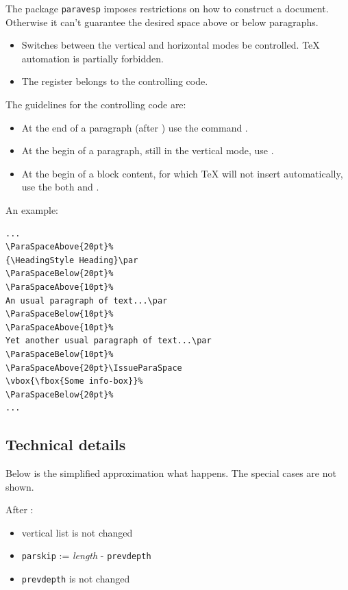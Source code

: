 \documentclass[]{ltugboat}
\begin{document}
The package \verb|paravesp| imposes restrictions on how to construct a document. Otherwise it can't guarantee the desired space above or below paragraphs.

\begin{itemize}
\item Switches between the vertical and horizontal modes be controlled. \TeX{} automation is partially forbidden.
\item The register  belongs to the controlling code.
\end{itemize}

The guidelines for the controlling code are:

\begin{itemize}
\item At the end of a paragraph (after ) use the command .
\item At the begin of a paragraph, still in the vertical mode, use .
\item At the begin of a block content, for which \TeX{} will not insert  automatically, use the both  and .
\end{itemize}

An example:

\begin{verbatim}
...
\ParaSpaceAbove{20pt}%
{\HeadingStyle Heading}\par
\ParaSpaceBelow{20pt}%
\ParaSpaceAbove{10pt}%
An usual paragraph of text...\par
\ParaSpaceBelow{10pt}%
\ParaSpaceAbove{10pt}%
Yet another usual paragraph of text...\par
\ParaSpaceBelow{10pt}%
\ParaSpaceAbove{20pt}\IssueParaSpace
\vbox{\fbox{Some info-box}}%
\ParaSpaceBelow{20pt}%
...
\end{verbatim}

\subsection{Technical details}

Below is the simplified approximation what happens. The special cases are not shown.

\medskip

After :

\begin{itemize}
\item vertical list is not changed
\item \verb|parskip| := \textit{length} - \verb|prevdepth|
\item \verb|prevdepth| is not changed
\end{itemize}
\end{document}
